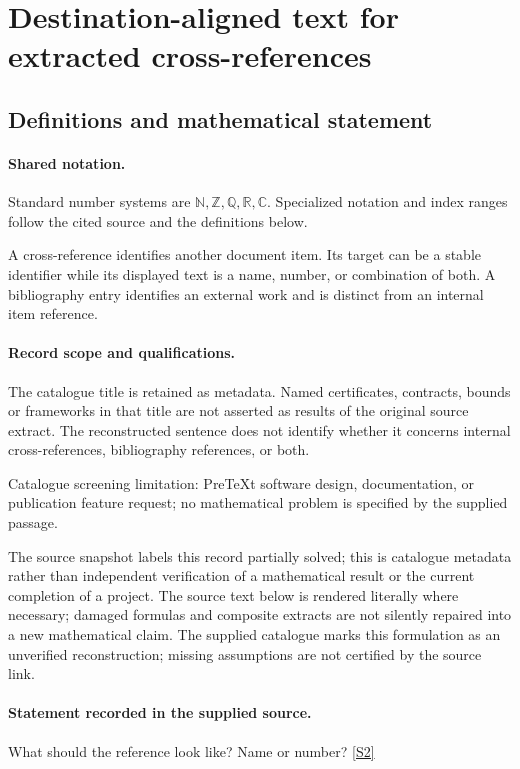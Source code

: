 \documentclass[11pt]{article}
\newcommand{\sref}[2]{\hyperlink{source:#1:#2}{[S#2]}}
\begin{document}
\section{Destination-aligned text for extracted cross-references}\label{statement}

\subsection{Definitions and mathematical statement}

\paragraph{Shared notation.}Standard number systems are $\mathbb N,\mathbb Z,\mathbb Q,\mathbb R,\mathbb C$. Specialized notation and index ranges follow the cited source and the definitions below.


A cross-reference identifies another document item. Its target can be a stable identifier while its displayed text is a name, number, or combination of both. A bibliography entry identifies an external work and is distinct from an internal item reference.
\paragraph{Record scope and qualifications.}
The catalogue title is retained as metadata. Named certificates, contracts, bounds or frameworks in that title are not asserted as results of the original source extract.
The reconstructed sentence does not identify whether it concerns internal cross-references, bibliography references, or both.

Catalogue screening limitation: PreTeXt software design, documentation, or publication feature request; no mathematical problem is specified by the supplied passage.

The source snapshot labels this record partially solved; this is catalogue metadata rather than independent verification of a mathematical result or the current completion of a project.
The source text below is rendered literally where necessary; damaged formulas and composite extracts are not silently repaired into a new mathematical claim.
The supplied catalogue marks this formulation as an unverified reconstruction; missing assumptions are not certified by the source link.
\paragraph{Statement recorded in the supplied source.}
What should the reference look like? Name or number? \sref{statement}{2}
\end{document}
